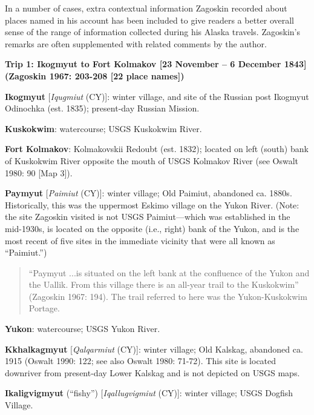 In a number of cases, extra contextual information Zagoskin recorded about places named in his account has been included to give readers a better overall sense of the range of information collected during his Alaska travels. Zagoskin's remarks are often supplemented with related comments by the author.


\vspace{1cm}
\noindent
\textbf{Trip 1: Ikogmyut to Fort Kolmakov [23 November – 6 December 1843]
(Zagoskin 1967: 203-208 [22 place names])}
\vspace{6pt}

\begin{hang}

\textbf{Ikogmyut} [\textit{Iqugmiut} (CY)]: winter village, and site of the Russian post Ikogmyut Odinochka (est. 1835); present-day Russian Mission.



\textbf{Kuskokwim}: watercourse; USGS Kuskokwim River.



\textbf{Fort Kolmakov}: Kolmakovskii Redoubt (est. 1832); located on left (south) bank of Kuskokwim River opposite the mouth of USGS Kolmakov River (see Oswalt 1980: 90 [Map 3]).



\textbf{Paymyut} [\textit{Paimiut} (CY)]: winter village; Old Paimiut, abandoned ca. 1880s. Historically, this was the uppermost Eskimo village on the Yukon River. (Note: the site Zagoskin visited is not USGS Paimiut—which was established in the mid-1930s, is located on the opposite (i.e., right) bank of the Yukon, and is the most recent of five sites in the immediate vicinity that were all known as “Paimiut.”)



\begin{quote}“Paymyut ...is situated on the left bank at the confluence of the Yukon and the Uallik. From this village there is an all-year trail to the Kuskokwim” (Zagoskin 1967: 194). The trail referred to here was the Yukon-Kuskokwim Portage.
\end{quote}



\textbf{Yukon}: watercourse; USGS Yukon River.



\textbf{Kkhalkagmyut} [\textit{Qalqarmiut} (CY)]: winter village; Old Kalskag, abandoned ca. 1915 (Oswalt 1990: 122; see also Oswalt 1980: 71-72). This site is located downriver from present-day Lower Kalskag and is not depicted on USGS maps.



\textbf{Ikaligvigmyut} (“fishy”) [\textit{Iqallugvigmiut} (CY)]: winter village; USGS Dogfish Village.

\end{hang}

